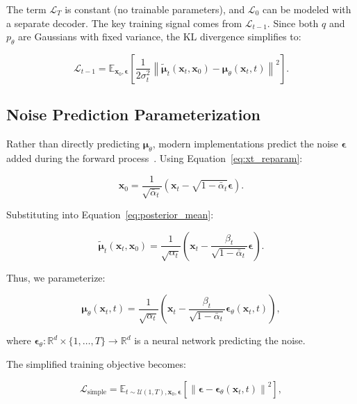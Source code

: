 \documentclass[12pt]{report}
\theoremstyle{definition}
\newcommand{\E}{\mathbb{E}}
\newcommand{\R}{\mathbb{R}}
\newcommand{\loss}{\mathcal{L}}
\newcommand{\norm}[1]{\left\| #1 \right\|}
\begin{document}
The term $\loss_T$ is constant (no trainable parameters), and $\loss_0$ can be modeled with a separate decoder. The key training signal comes from $\loss_{t-1}$. Since both $q$ and $p_\theta$ are Gaussians with fixed variance, the KL divergence simplifies to:

\begin{equation}
\loss_{t-1} = \E_{\mathbf{x}_0, \boldsymbol{\epsilon}}\left[\frac{1}{2\sigma_t^2}\norm{\tilde{\boldsymbol{\mu}}_t(\mathbf{x}_t, \mathbf{x}_0) - \boldsymbol{\mu}_\theta(\mathbf{x}_t, t)}^2\right].
\label{eq:loss_t_mean}
\end{equation}

\subsection{Noise Prediction Parameterization}

Rather than directly predicting $\boldsymbol{\mu}_\theta$, modern implementations predict the noise $\boldsymbol{\epsilon}$ added during the forward process~\citep{ho2020denoising}. Using Equation~\eqref{eq:xt_reparam}:

\begin{equation}
\mathbf{x}_0 = \frac{1}{\sqrt{\bar{\alpha}_t}}(\mathbf{x}_t - \sqrt{1 - \bar{\alpha}_t}\boldsymbol{\epsilon}).
\label{eq:x0_from_noise}
\end{equation}

Substituting into Equation~\eqref{eq:posterior_mean}:

\begin{equation}
\tilde{\boldsymbol{\mu}}_t(\mathbf{x}_t, \mathbf{x}_0) = \frac{1}{\sqrt{\alpha_t}}\left(\mathbf{x}_t - \frac{\beta_t}{\sqrt{1 - \bar{\alpha}_t}}\boldsymbol{\epsilon}\right).
\label{eq:mu_from_noise}
\end{equation}

Thus, we parameterize:

\begin{equation}
\boldsymbol{\mu}_\theta(\mathbf{x}_t, t) = \frac{1}{\sqrt{\alpha_t}}\left(\mathbf{x}_t - \frac{\beta_t}{\sqrt{1 - \bar{\alpha}_t}}\boldsymbol{\epsilon}_\theta(\mathbf{x}_t, t)\right),
\label{eq:mu_theta_noise}
\end{equation}

where $\boldsymbol{\epsilon}_\theta: \R^d \times \{1, \ldots, T\} \to \R^d$ is a neural network predicting the noise.

The simplified training objective becomes:

\begin{equation}
\loss_{\text{simple}} = \E_{t \sim \mathcal{U}(1,T), \mathbf{x}_0, \boldsymbol{\epsilon}}\left[\norm{\boldsymbol{\epsilon} - \boldsymbol{\epsilon}_\theta(\mathbf{x}_t, t)}^2\right],
\label{eq:loss_simple}
\end{equation}
\end{document}
